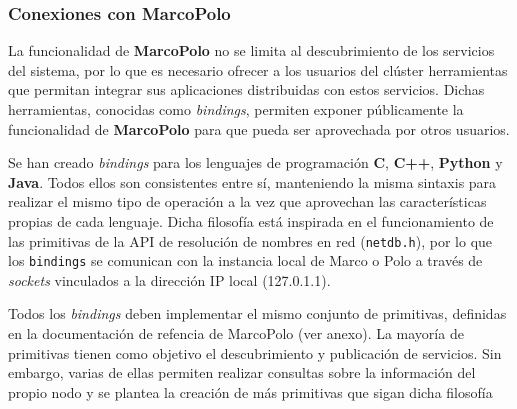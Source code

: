 

\subsubsection{Conexiones con MarcoPolo}

La funcionalidad de \textbf{MarcoPolo} no se limita al descubrimiento de los servicios del sistema, por lo que es necesario ofrecer a los usuarios del clúster herramientas que permitan integrar sus aplicaciones distribuidas con estos servicios. Dichas herramientas, conocidas como \textit{bindings}, permiten exponer públicamente la funcionalidad de \textbf{MarcoPolo} para que pueda ser aprovechada por otros usuarios.

Se han creado \textit{bindings} para los lenguajes de programación \textbf{C}, \textbf{C++}, \textbf{Python} y \textbf{Java}. Todos ellos son consistentes entre sí, manteniendo la misma sintaxis para realizar el mismo tipo de operación a la vez que aprovechan las características propias de cada lenguaje. Dicha filosofía está inspirada en el funcionamiento de las primitivas de la API de resolución de nombres en red (\texttt{netdb.h})\cite{netdb}, por lo que los \texttt{bindings} se comunican con la instancia local de Marco o Polo a través de \textit{sockets} vinculados a la dirección IP local (127.0.1.1).

Todos los \textit{bindings} deben implementar el mismo conjunto de primitivas, definidas en la documentación de refencia de MarcoPolo (ver anexo). La mayoría de primitivas tienen como objetivo el descubrimiento y publicación de servicios. Sin embargo, varias de ellas permiten realizar consultas sobre la información del propio nodo y se plantea la creación de más primitivas que sigan dicha filosofía

